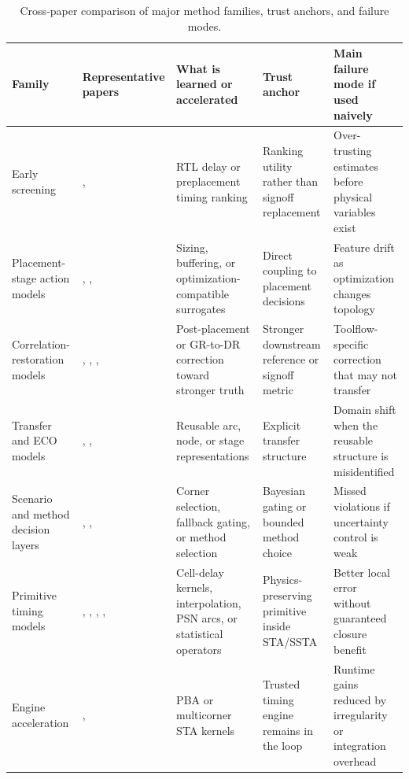 \documentclass[num-refs]{wiley-article}
\begin{document}
    \begin{table}[tbp]
    \centering
    \caption{Cross-paper comparison of major method families, trust anchors, and failure modes.}
    \label{tab:wiley-3}
    \small
    \begin{tabularx}{\textwidth}{>{\raggedright\arraybackslash}X >{\raggedright\arraybackslash}X >{\raggedright\arraybackslash}X >{\raggedright\arraybackslash}X >{\raggedright\arraybackslash}X}
    \toprule
    \textbf{Family} & \textbf{Representative papers} & \textbf{What is learned or accelerated} & \textbf{Trust anchor} & \textbf{Main failure mode if used naively} \\
    \midrule
    Early screening & \cite{ref27}, \cite{ref29} & RTL delay or preplacement timing ranking & Ranking utility rather than signoff replacement & Over-trusting estimates before physical variables exist \\
    Placement-stage action models & \cite{ref1}, \cite{ref2}, \cite{ref3} & Sizing, buffering, or optimization-compatible surrogates & Direct coupling to placement decisions & Feature drift as optimization changes topology \\
    Correlation-restoration models & \cite{ref25}, \cite{ref13}, \cite{ref10}, \cite{ref7} & Post-placement or GR-to-DR correction toward stronger truth & Stronger downstream reference or signoff metric & Toolflow-specific correction that may not transfer \\
    Transfer and ECO models & \cite{ref4}, \cite{ref6}, \cite{ref19} & Reusable arc, node, or stage representations & Explicit transfer structure & Domain shift when the reusable structure is misidentified \\
    Scenario and method decision layers & \cite{ref16}, \cite{ref28}, \cite{ref9} & Corner selection, fallback gating, or method selection & Bayesian gating or bounded method choice & Missed violations if uncertainty control is weak \\
    Primitive timing models & \cite{ref24}, \cite{ref11}, \cite{ref12}, \cite{ref30}, \cite{ref34} & Cell-delay kernels, interpolation, PSN arcs, or statistical operators & Physics-preserving primitive inside STA/SSTA & Better local error without guaranteed closure benefit \\
    Engine acceleration & \cite{ref21}, \cite{ref22} & PBA or multicorner STA kernels & Trusted timing engine remains in the loop & Runtime gains reduced by irregularity or integration overhead \\
    \bottomrule
    \end{tabularx}
    \end{table}
\end{document}
